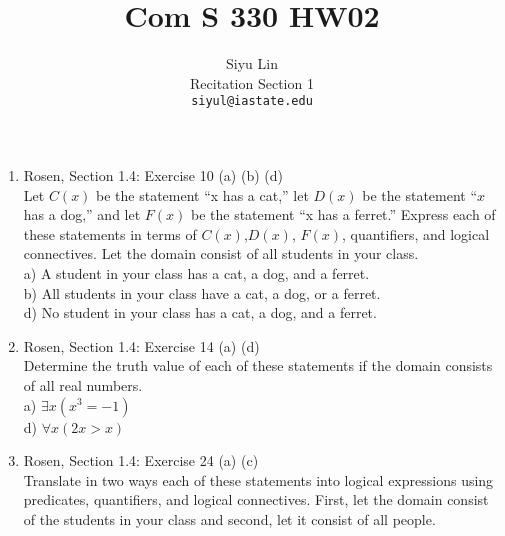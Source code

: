 \documentclass[12pt]{article}
\title{Com S 330 HW02}
\author{Siyu Lin \\Recitation Section 1\\ \texttt{siyul@iastate.edu}}
\begin{document}
\maketitle

\begin{enumerate}
\item Rosen, Section 1.4: Exercise 10 (a) (b) (d)\\
Let $C(x)$ be the statement ``x has a cat,'' let $D(x)$ be the statement ``$x$ has a dog,'' and let $F(x)$ be the statement ``x has a ferret.'' Express each of these statements in terms of $C(x)$,$D(x)$, $F(x)$, quantifiers, and logical connectives. Let the domain consist of all students in your class.\\
a) A student in your class has a cat, a dog, and a ferret.\\
b) All students in your class have a cat, a dog, or a ferret.\\
d) No student in your class has a cat, a dog, and a ferret.\\
\item Rosen, Section 1.4: Exercise 14 (a) (d)\\
Determine the truth value of each of these statements if
the domain consists of all real numbers.\\
a) $\exists x (x^3 = -1)$\\
d) $\forall x (2x > x)$\\
\item Rosen, Section 1.4: Exercise 24 (a) (c)\\
Translate in two ways each of these statements into logical expressions using predicates, quantifiers, and logical connectives. First, let the domain consist of the students in your class and second, let it consist of all people.\\

\end{enumerate}
\end{document}
